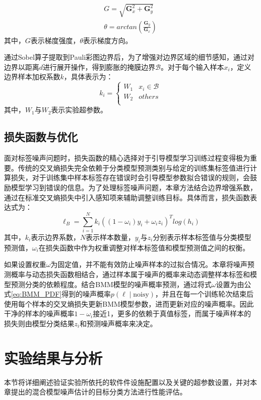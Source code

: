 \begin{gather}
    G=\sqrt{\textbf{G}_x^2+\textbf{G}_y^2}
    \\
    \theta=arctan(\frac{\textbf{G}_y}{\textbf{G}_x})
\end{gather}
其中，$G$表示梯度强度，$\theta$表示梯度方向。

通过Sobel算子提取到Pauli彩图边界后，为了增强对边界区域的细节感知，通过对边界以距离$d$进行展开操作，得到膨胀的掩膜边界$\mathcal{B}$。对于每个输入样本$x_i$，定义边界样本加权系数$k$，具体表示为：
\begin{equation}
    k_i=\begin{cases}
        W_1 & x_i\in \mathcal{B} \\
        W_2 & others             \\
    \end{cases}
\end{equation}
其中，$W_1$与$W_2$表示实验超参数。


\subsection{损失函数与优化}
面对标签噪声问题时，损失函数的精心选择对于引导模型学习训练过程变得极为重要。传统的交叉熵损失完全依赖于分类模型预测类别与给定的训练集标签值进行计算损失，对于训练集中样本标签存在错误时会引导模型参数拟合错误的规则，会鼓励模型学习到错误的信息。为了处理标签噪声问题，本章方法结合边界增强系数，通过在标准交叉熵损失中引入感知项来辅助调整训练目标。具体而言，损失函数表达式为：
\begin{equation}
    \ell_B=\sum_{i=1}^{N}k_i((1-\omega_i)y_i+\omega_iz_i)^Tlog(h_i)
\end{equation}
其中，$k_i$表示边界系数，$N$表示样本数量，$y_i$与$z_i$分别表示样本标签值与分类模型预测值，$\omega_i$在损失函数中作为权重调整对样本标签值和模型预测值之间的权衡。

如果设置权重$\omega$为固定值，并不能有效防止噪声样本的过拟合情况。本章将噪声预测概率与动态损失函数相结合，通过样本属于噪声的概率来动态调整样本标签和模型预测分类的依赖程度。结合BMM模型的噪声概率预测，通过将式$\omega$设置为由公式\eqref{eq:BMM_PDF}得到的噪声概率$p(\ell \mid \text{noisy})$，并且在每一个训练轮次结束后使用每个样本的交叉熵损失更新BMM模型参数，进而更新对应的噪声概率。因此干净的样本的噪声概率$1-\omega_i$接近1，更多的依赖于真值标签，而属于噪声样本的损失则由模型分类结果$z_i$和预测噪声概率来决定。

\section{实验结果与分析}
本节将详细阐述验证实验所依托的软件件设施配置以及关键的超参数设置，并对本章提出的混合模型噪声估计的目标分类方法进行性能评估。

